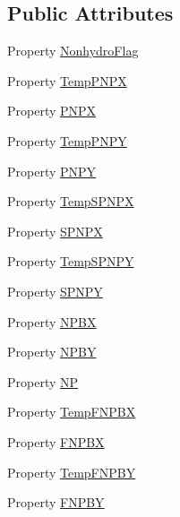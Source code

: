 \subsection*{Public Attributes}
\begin{DoxyCompactItemize}
\item 
Property \hyperlink{class_ndg_nonhydrostatic_solver2d_a6236ae6cba4d05c2b4efcf53f488489d}{Nonhydro\+Flag}
\item 
Property \hyperlink{class_ndg_nonhydrostatic_solver2d_a43b87907aab6f49bb3c45a5dd37b0dc9}{Temp\+P\+N\+PX}
\item 
Property \hyperlink{class_ndg_nonhydrostatic_solver2d_a62011b90f6bef4968a70b04de28a0118}{P\+N\+PX}
\item 
Property \hyperlink{class_ndg_nonhydrostatic_solver2d_aec970135b5e05d96326f5ed53981dca6}{Temp\+P\+N\+PY}
\item 
Property \hyperlink{class_ndg_nonhydrostatic_solver2d_afd6d70b6f960ffa3a87bced72a2d129e}{P\+N\+PY}
\item 
Property \hyperlink{class_ndg_nonhydrostatic_solver2d_afaa120aa27fdfd5866f04aa7be003492}{Temp\+S\+P\+N\+PX}
\item 
Property \hyperlink{class_ndg_nonhydrostatic_solver2d_a3faeb9debdf3ca37b7f84c18a0b0502b}{S\+P\+N\+PX}
\item 
Property \hyperlink{class_ndg_nonhydrostatic_solver2d_acc6954955b61d40ab39b3fa17a671ce4}{Temp\+S\+P\+N\+PY}
\item 
Property \hyperlink{class_ndg_nonhydrostatic_solver2d_ac5911062a995cf7ef66d18ccd5f6340d}{S\+P\+N\+PY}
\item 
Property \hyperlink{class_ndg_nonhydrostatic_solver2d_a3aa5cb1f32cba0b59cc4d3c7834fcfe4}{N\+P\+BX}
\item 
Property \hyperlink{class_ndg_nonhydrostatic_solver2d_abce791f88fd463365fa475d5b5b5c414}{N\+P\+BY}
\item 
Property \hyperlink{class_ndg_nonhydrostatic_solver2d_adbef079b135f2ba563b22f9f1d7ed63a}{NP}
\item 
Property \hyperlink{class_ndg_nonhydrostatic_solver2d_a211f2b9748ddacf190f4eea9f9e09122}{Temp\+F\+N\+P\+BX}
\item 
Property \hyperlink{class_ndg_nonhydrostatic_solver2d_a8863634f52221d73fc4fe0a53220f302}{F\+N\+P\+BX}
\item 
Property \hyperlink{class_ndg_nonhydrostatic_solver2d_a1a3be447425254d0a4fc1e8c63c6b1e7}{Temp\+F\+N\+P\+BY}
\item 
Property \hyperlink{class_ndg_nonhydrostatic_solver2d_aed9f22f9f24281e3efcc991f2da65d56}{F\+N\+P\+BY}

\end{DoxyCompactItemize}
